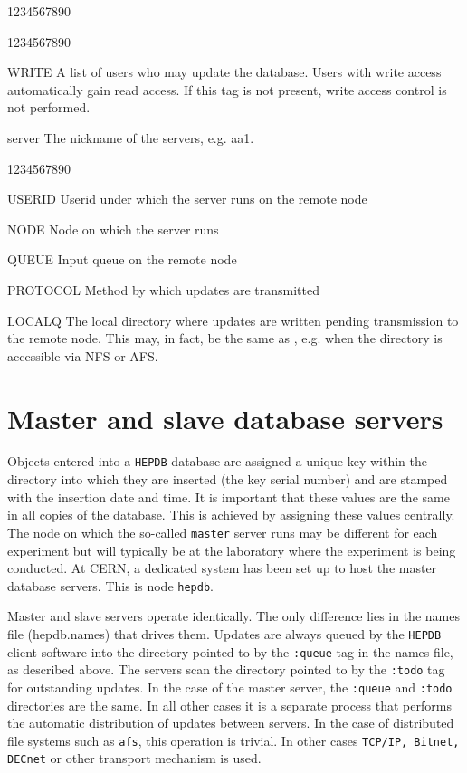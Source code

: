 \begin{DLtt}{1234567890}
\begin{DLtt}{1234567890}
\item[WRITE]A list of users who may update the database.
Users with write access automatically gain read access.
If this tag is not present, write access control is not performed.
\end{DLtt}
\item[server]The nickname of the servers, e.g. {\Lit aa1}.
\begin{DLtt}{1234567890}
\item[USERID]Userid under which the server runs on the remote node
\item[NODE]Node on which the server runs
\item[QUEUE]Input queue on the remote node
\item[PROTOCOL]Method by which updates are transmitted
\item[LOCALQ]The local directory where updates are written pending
transmission to the remote node. This may, in fact, be the same
as , e.g. when the directory is accessible via NFS
or AFS.
%
\end{DLtt}
\end{DLtt}

\section{Master and slave database servers}

Objects entered into a {\tt HEPDB} database are assigned a unique
key within the directory into which they are inserted (the key serial number)
and are stamped with the insertion date and time. It is important
that these values are the same in all copies of the database. This is
achieved by assigning these values centrally. The node on which the
so-called {\tt master} server runs may be different for each experiment
but will typically be at the laboratory where the experiment is being
conducted. At CERN, a dedicated system has been set up to host the
master database servers. This is node {\tt hepdb}.

Master and slave servers operate identically. The only difference
lies in the names file  (hepdb.names) that drives them. Updates are always queued
by the {\tt HEPDB} client software into the directory pointed to
by the {\tt :queue} tag in the names file, as described above.
The servers scan the directory pointed to by the {\tt :todo} tag
for outstanding updates. In the case of the master server, the
{\tt :queue} and {\tt :todo} directories are the same. In all other
cases it is a separate process that performs the automatic distribution
of updates between servers. In the case of distributed file systems
such as {\tt afs}, this operation is trivial. In other cases
{\tt TCP/IP, Bitnet, DECnet} or other transport mechanism is used.

